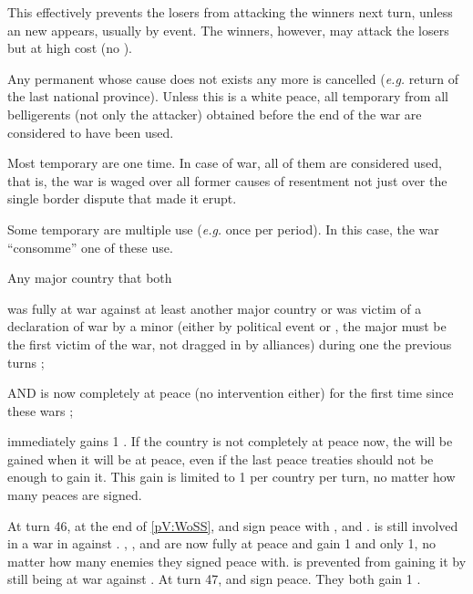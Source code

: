 \begin{designnote}
  This effectively prevents the losers from attacking the winners next turn,
  unless an new \CB appears, usually by event. The winners, however, may
  attack the losers but at high cost (no \CB).
\end{designnote}

\bparag Any permanent \CB whose cause does not exists any more is cancelled
(\emph{e.g.} return of the last national province).
\bparag Unless this is a white peace, all temporary \CB from all belligerents
(not only the attacker) obtained before the end of the war are considered to
have been used.

\begin{designnote}[Temporary \CB]
  Most temporary \CB are one time. In case of war, all of them are considered
  used, that is, the war is waged over all former causes of resentment not
  just over the single border dispute that made it erupt.

  Some temporary \CB are multiple use (\emph{e.g.} once per period). In this
  case, the war ``consomme'' one of these use.
\end{designnote}

\label{chPeace:Peace and Stability}
Any major country that both
\begin{modlist}
\item was fully at war against at least another major country or was victim of
  a declaration of war by a minor (either by political event or \RD, the major
  must be the first victim of the war, not dragged in by alliances) during one
  the previous turns ;
\item[AND] is now completely at peace (no intervention either) for the first
  time since these wars ;
\end{modlist}
immediately gains 1 \STAB.
\bparag If the country is not completely at peace now, the \STAB will be
gained when it will be at peace, even if the last peace treaties should not be
enough to gain it.
\bparag This gain is limited to 1 \STAB per country per turn, no matter how
many peaces are signed.

\begin{exemple}
  At turn 46, at the end of \ref{pV:WoSS}, \FRA and \HIS sign peace with \ANG,
  \HOL and \AUS. \AUS is still involved in a war in \paysHongrie against
  \TUR. \FRA, \HIS, \ANG and \HOL are now fully at peace and gain 1 \STAB and
  only 1, no matter how many enemies they signed peace with. \AUS is prevented
  from gaining it by still being at war against \TUR. At turn 47, \AUS and
  \TUR sign peace. They both gain 1 \STAB.
\end{exemple}

